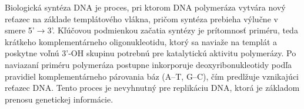 Biologická syntéza DNA je proces,
pri ktorom DNA polymeráza vytvára
nový reťazec na základe templátového vlákna, pričom syntéza
prebieha výlučne v smere 5'$\rightarrow$3'. Kľúčovou podmienkou začatia
syntézy je prítomnosť priméru, teda krátkeho komplementárneho
oligonukleotidu, ktorý sa naviaže na templát a poskytne voľnú
3'-OH skupinu potrebnú pre katalytickú aktivitu polymerázy.
Po naviazaní priméru polymeráza postupne inkorporuje deoxyribonukleotidy
podľa pravidiel komplementárneho párovania báz (A--T, G--C), čím predlžuje
vznikajúci reťazec DNA. Tento proces je nevyhnutný pre replikáciu DNA, ktorá je základom
prenosu genetickej informácie.
